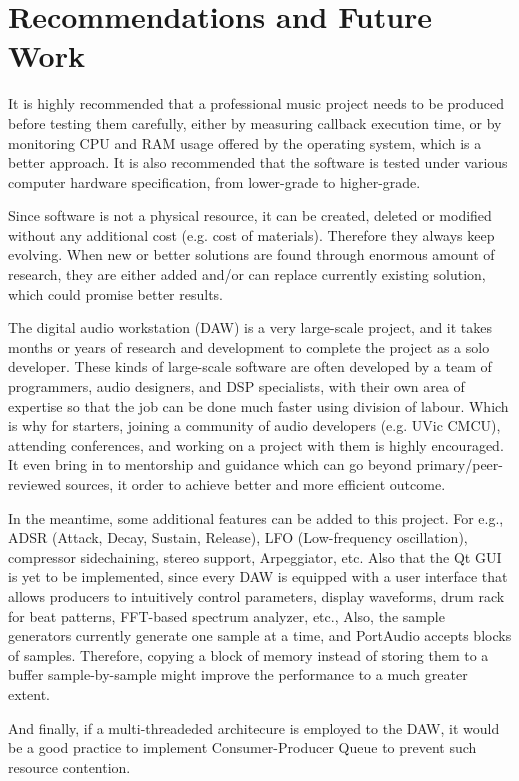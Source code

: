 \section{Recommendations and Future Work}

It is highly recommended that a professional music project needs to be produced before testing them carefully, 
either by measuring callback execution time, or by monitoring CPU and RAM usage offered by the operating system, which is a 
better approach.
It is also recommended that the software is tested under various computer hardware specification, from lower-grade to
higher-grade.

Since software is not a physical resource, it can be created, deleted or modified without any additional cost 
(e.g. cost of materials).
Therefore they always keep evolving. When new or better solutions are found through enormous amount of research, 
they are either added and/or can replace currently existing solution, which could promise better results.

The digital audio workstation (DAW) is a very large-scale project, and it takes months or years of research and
development to complete the project as a solo developer. These kinds of large-scale software are often developed
by a team of programmers, audio designers, and DSP specialists, with their own area of expertise so that the job
can be done much faster using division of labour.
Which is why for starters, joining a community of audio developers (e.g. UVic CMCU),
attending conferences, and working on a project with them is highly encouraged. It even bring in to mentorship and guidance which
can go beyond primary/peer-reviewed sources, it order to achieve better and more efficient outcome.

In the meantime, some additional features can be added to this project. For e.g., 
ADSR (Attack, Decay, Sustain, Release), LFO (Low-frequency oscillation), compressor
sidechaining, stereo support, Arpeggiator, etc. Also that the Qt GUI is yet to be implemented, since every
DAW is equipped with a user interface that allows producers
to intuitively control parameters, display waveforms, drum rack for beat patterns, FFT-based spectrum analyzer, etc.,
Also, the sample generators currently generate one sample
at a time, and PortAudio accepts blocks of samples. Therefore, copying a block of memory
instead of storing them to a buffer sample-by-sample might improve the performance to a much
greater extent.

And finally, if a multi-threadeded architecure is employed to the DAW, it would be a good practice to implement 
Consumer-Producer Queue \cite{susser_adc2025} to prevent such resource contention.



